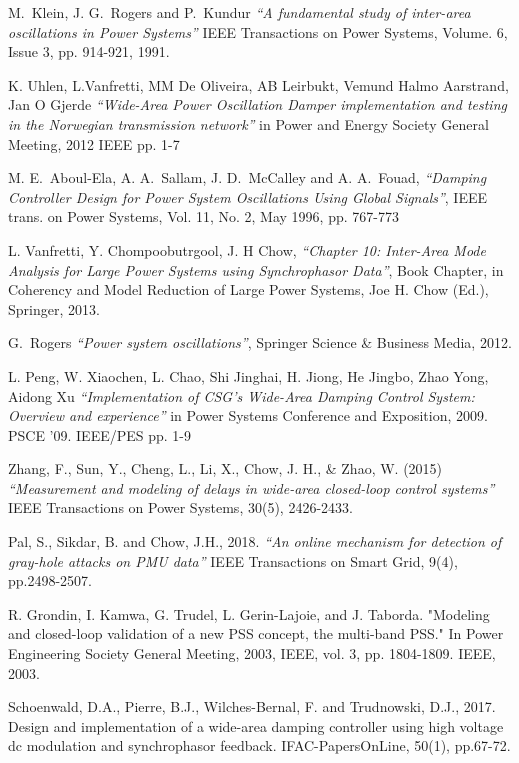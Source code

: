 \documentclass{ieeeaccess}
\begin{document}
\begin{thebibliography}{00}


M.~Klein, J. G.~Rogers and P.~Kundur \emph{``A fundamental study of inter-area oscillations in Power Systems''}  IEEE Transactions on Power Systems, Volume. 6, Issue 3, pp. 914-921, 1991. 

 K. Uhlen, L.Vanfretti, MM De Oliveira, AB Leirbukt, Vemund Halmo Aarstrand, Jan O Gjerde \emph{``Wide-Area Power Oscillation Damper implementation and testing in the Norwegian transmission network''} in Power and Energy Society General Meeting, 2012 IEEE pp. 1-7

  M. E.~Aboul-Ela, A. A.~Sallam, J. D.~McCalley and A. A.~Fouad, \emph{``Damping Controller Design for Power System Oscillations Using Global Signals''}, IEEE trans. on Power Systems, Vol. 11, No. 2, May 1996, pp. 767-773

  L. Vanfretti, Y. Chompoobutrgool, J. H Chow, \emph{``Chapter 10: Inter-Area Mode Analysis for Large Power Systems using Synchrophasor Data''}, Book Chapter, in Coherency and Model Reduction of Large Power Systems, Joe H. Chow (Ed.), Springer, 2013.

 G.~Rogers \emph{``Power system oscillations''}, Springer Science \& Business Media, 2012. 

 L. Peng, W. Xiaochen, L. Chao, Shi Jinghai, H. Jiong, He Jingbo, Zhao Yong, Aidong Xu \emph{``Implementation of CSG's Wide-Area Damping Control System: Overview and experience''} in Power Systems Conference and Exposition, 2009. PSCE '09. IEEE/PES pp. 1-9

 Zhang, F., Sun, Y., Cheng, L., Li, X., Chow, J. H., \& Zhao, W. (2015) \emph{``Measurement and modeling of delays in wide-area closed-loop control systems''} IEEE Transactions on Power Systems, 30(5), 2426-2433.

 Pal, S., Sikdar, B. and Chow, J.H., 2018. \emph{``An online mechanism for detection of gray-hole attacks on PMU data''} IEEE Transactions on Smart Grid, 9(4), pp.2498-2507.

 R. Grondin, I. Kamwa, G. Trudel, L. Gerin-Lajoie, and J. Taborda. "Modeling and closed-loop validation of a new PSS concept, the multi-band PSS." In Power Engineering Society General Meeting, 2003, IEEE, vol. 3, pp. 1804-1809. IEEE, 2003.

 Schoenwald, D.A., Pierre, B.J., Wilches-Bernal, F. and Trudnowski, D.J., 2017. Design and implementation of a wide-area damping controller using high voltage dc modulation and synchrophasor feedback. IFAC-PapersOnLine, 50(1), pp.67-72.


\end{thebibliography}
\end{document}
